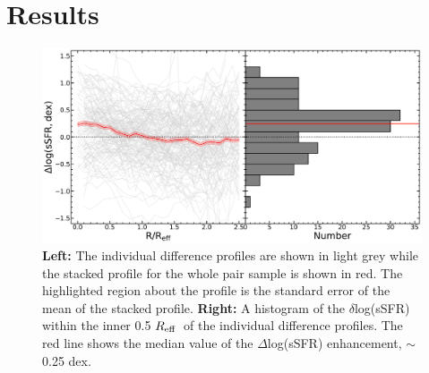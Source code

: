 \documentclass[iop,revtex4,twocolumn,apj,numberedappendix,appendixfloats]{emulateapj}
\newcommand{\reff}{$R_{\rm eff}$}
\begin{document}
\section{Results}\label{sec:results}
\begin{figure}
\centering
\includegraphics[width=\linewidth]{fig/ssfr_unsplit.pdf}
\caption[]{\textbf{Left:} The individual difference profiles are shown in light grey while the stacked profile for the whole pair sample is shown in red. The highlighted region about the profile is the standard error of the mean of the stacked profile. \textbf{Right:} A histogram of the $\delta$log(sSFR) within the inner 0.5 \reff\ of the individual difference profiles. The red line shows the median value of the $\Delta$log(sSFR) enhancement, $\sim$0.25 dex.}
\label{fig:ssfr_all}
\end{figure}
\end{document}
